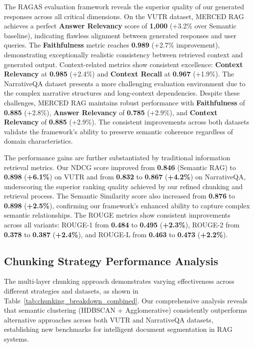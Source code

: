 \documentclass[10pt,twocolumn,letterpaper]{article}
\begin{document}
\vspace{0.5em}
The RAGAS evaluation framework reveals the superior quality of our generated responses across all critical dimensions. On the VUTR dataset, MERCED RAG achieves a perfect \textbf{Answer Relevancy} score of \textbf{1,000} (+3.2\% over Semantic baseline), indicating flawless alignment between generated responses and user queries. The \textbf{Faithfulness} metric reaches \textbf{0.989} (+2.7\% improvement), demonstrating exceptionally realistic consistency between retrieved context and generated output. Context-related metrics show consistent excellence: \textbf{Context Relevancy} at \textbf{0.985} (+2.4\%) and \textbf{Context Recall} at \textbf{0.967} (+1.9\%). The NarrativeQA dataset presents a more challenging evaluation environment due to the complex narrative structures and long-context dependencies. Despite these challenges, MERCED RAG maintains robust performance with \textbf{Faithfulness} of \textbf{0.885} (+2.8\%), \textbf{Answer Relevancy} of \textbf{0.785} (+2.9\%), and \textbf{Context Relevancy} of \textbf{0.885} (+2.9\%). The consistent improvements across both datasets validate the framework's ability to preserve semantic coherence regardless of domain characteristics.


\vspace{0.5em}
The performance gains are further substantiated by traditional information retrieval metrics. Our NDCG score improved from \textbf{0.846} (Semantic RAG) to \textbf{0.898} (\textbf{+6.1\%}) on VUTR and from \textbf{0.832} to \textbf{0.867} (\textbf{+4.2\%}) on NarrativeQA, underscoring the superior ranking quality achieved by our refined chunking and retrieval process. The Semantic Similarity score also increased from \textbf{0.876} to \textbf{0.898} (\textbf{+2.5\%}), confirming our framework's enhanced ability to capture complex semantic relationships. The ROUGE metrics show consistent improvements across all variants: ROUGE-1 from \textbf{0.484} to \textbf{0.495} (\textbf{+2.3\%}), ROUGE-2 from \textbf{0.378} to \textbf{0.387} (\textbf{+2.4\%}), and ROUGE-L from \textbf{0.463} to \textbf{0.473} (\textbf{+2.2\%}).


\subsection{Chunking Strategy Performance Analysis}

The multi-layer chunking approach demonstrates varying effectiveness across different strategies and datasets, as shown in Table~\ref{tab:chunking_breakdown_combined}. Our comprehensive analysis reveals that semantic clustering (HDBSCAN + Agglomerative) consistently outperforms alternative approaches across both VUTR and NarrativeQA datasets, establishing new benchmarks for intelligent document segmentation in RAG systems.
\end{document}

